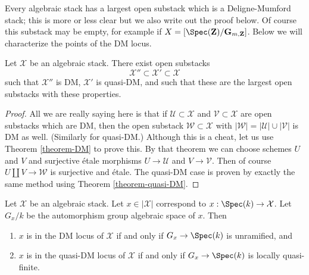 \noindent
Every algebraic stack has a largest open substack which is a
Deligne-Mumford stack; this is more or less clear but we also
write out the proof below. Of course this substack may be empty,
for example if $X = [\Spec(\mathbf{Z})/\mathbf{G}_{m, \mathbf{Z}}]$.
Below we will characterize the points of the DM locus.

\begin{lemma}
\label{lemma-open-DM-locus}
Let $\mathcal{X}$ be an algebraic stack. There exist open substacks
$$
\mathcal{X}'' \subset \mathcal{X}' \subset \mathcal{X}
$$
such that $\mathcal{X}''$ is DM, $\mathcal{X}'$ is quasi-DM, and
such that these are the largest open substacks with these properties.
\end{lemma}

\begin{proof}
All we are really saying here is that if $\mathcal{U} \subset \mathcal{X}$
and $\mathcal{V} \subset \mathcal{X}$ are open substacks which are DM,
then the open substack $\mathcal{W} \subset \mathcal{X}$
with $|\mathcal{W}| = |\mathcal{U}| \cup |\mathcal{V}|$
is DM as well. (Similarly for quasi-DM.) Although this is a cheat, let
us use Theorem \ref{theorem-DM} to prove this.
By that theorem we can choose
schemes $U$ and $V$ and surjective \'etale morphisms
$U \to \mathcal{U}$ and $V \to \mathcal{V}$.
Then of course $U \amalg V \to \mathcal{W}$ is surjective and \'etale.
The quasi-DM case is proven by exactly the same method using
Theorem \ref{theorem-quasi-DM}.
\end{proof}

\begin{lemma}
\label{lemma-points-DM-locus}
Let $\mathcal{X}$ be an algebraic stack. Let $x \in |\mathcal{X}|$
correspond to $x : \Spec(k) \to \mathcal{X}$. Let $G_x/k$
be the automorphism group algebraic space of $x$. Then
\begin{enumerate}
\item  $x$ is in the DM locus of $\mathcal{X}$
if and only if $G_x \to \Spec(k)$ is unramified, and
\item $x$ is in the quasi-DM locus of $\mathcal{X}$
if and only if $G_x \to \Spec(k)$ is locally quasi-finite.
\end{enumerate}
\end{lemma}

